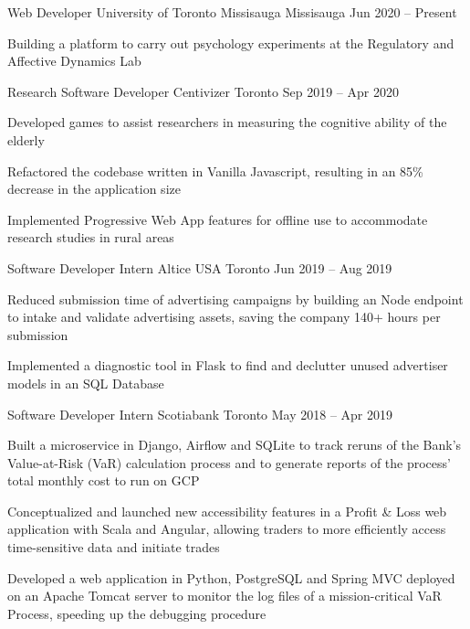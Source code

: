 \begin{cventries}
  \cventry
    {Web Developer}
    {University of Toronto Missisauga}
    {Missisauga}
    {Jun 2020 -- Present}
    {}
    {
      \begin{cvitems}
        \item {Building a platform to carry out psychology experiments at the Regulatory and Affective Dynamics Lab}
      \end{cvitems}
    }
  \cventry
    {Research Software Developer}
    {Centivizer}
    {Toronto}
    {Sep 2019 -- Apr 2020}
    {}
    {
      \begin{cvitems}
        \item {Developed games to assist researchers in measuring the cognitive ability of the elderly}
        \item {Refactored the codebase written in Vanilla Javascript, resulting in an 85\% decrease in the application size}
        \item {Implemented Progressive Web App features for offline use to accommodate research studies in rural areas}
      \end{cvitems}
    }
  \cventry
    {Software Developer Intern}
    {Altice USA}
    {Toronto}
    {Jun 2019 -- Aug 2019}
    {}
    {
    \begin{cvitems}
      \item {Reduced submission time of advertising campaigns by building an Node endpoint to intake and validate advertising assets, saving the company 140+ hours per submission}
      \item {Implemented a diagnostic tool in Flask to find and declutter unused advertiser models in an SQL Database}
    \end{cvitems}
    }
  \cventry
    {Software Developer Intern}
    {Scotiabank}
    {Toronto}
    {May 2018 -- Apr 2019}
    {}
    {
      \begin{cvitems}
        \item {Built a microservice in Django, Airflow and SQLite to track reruns of the Bank's Value-at-Risk (VaR) calculation process and to generate reports of the process' total monthly cost to run on GCP}
        \item {Conceptualized and launched new accessibility features in a Profit \& Loss web application with Scala and Angular, allowing traders to more efficiently access time-sensitive data and initiate trades}
        \item {Developed a web application in Python, PostgreSQL and Spring MVC deployed on an Apache Tomcat server to monitor the log files of a mission-critical VaR Process, speeding up the debugging procedure}
      \end{cvitems}
    }
  

\end{cventries}
